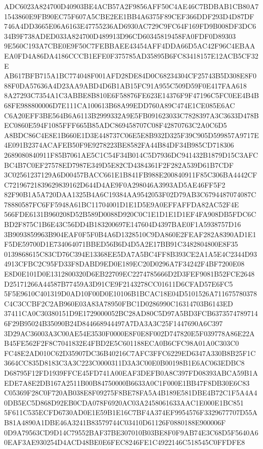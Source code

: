 \documentclass[UTF8,fontset=fandol,zihao=-4,a4paper]{ctexart}
\begin{document}
{{ADC6023A824700D40903BE4ACB57A2F9856AFF50C4AE46C7BDBAB1CB80A71543860E9FB90EC75F607A5CBE2EE1BB4A6375F89CEF366DDF293D4D87DF
746A4DD3665E06A6163E47755236AD6930AC729C9FC64F169FD9B008DF3DC634B9F738ADED033A824700D489913D96CD60345819458FA0FDF0D89303
9E560C193A7CBE0E9F50C7FEBBAEE43454AFF4DDA66D5AC42F96C4EBAAEA0FD4A86DA4186CCCB1EFE0F375785AD35895B6FC83418157E12ACB5CF32E
AB617BFB715A1BC774048F001AFD28DE84D0C68234304CF25743B5D308E8F088F0DA57636A4D23AA9ABD4D6B1AB15FC91A955C509D59F0E417FAA618
8A27293C7354A1C3ABBE8B810E6F58876FE623E14376F9F47196C5FC0EE4B4B68FE988800006D7E111CA100613B68A99EDD760A89C474E1CE085E6AC
C6A20EFF3BE564B6A6113B2999332A9E5FB091623033C7828397A3C3633D478BEC0860E594F1085FFF665B85ADC869458707C08F42870763C2A0C6D5
A8BDC86C4E8E1B660E1D3E448737C06E5E8B932D325F39C905D599857A9717E4E091B2374ACAFEB50F9E9278223BE8582FA44B84DF34B985CD718306
2689080840911F85B7061AE5C1C54F34B014C5D7936DC941432B1879D15C3AFCBC4B7C0EF27578ED7987E349D5E82CD4384361F2F282A539D61B7CDF
3C02561237129A6D00457BACC661E1B841FB988E200840911F85C306BA4442CFC72196721839629839162D644D4AE9F0A298046A3993AD5AE46FF5F2
82F90B1A5A720DAA1325B4A6C19384AA9542053F02D79AB3C6794487074087C78880587FC6FF5948A61BC11704001D1E1D5E9A0EFFAFFDA82AC52F4E
566FDE6131B960208D52B589D0088D920C0C1E1D1E1D1EF4FA908DB5FDC6CBD2F875C1B6E43C56DD4B183200697E147604D4397BAE0F1A5938757D16
3B9093859963B904EAF0F5F0B4A6D1328510C9DA860E2FEAF282A8390AD1E1F5DE59700D1E734064071BBED56B6D4D5A2E17BB91C3482804800E8F35
0139868615C83CD76C394E13368EE5DA7A5BC4FF8B393CE2A1A5E4C2344D934913CFBC2C95FD33F8DABD9ED0E189EC20D0296A7F34242F4BF7200E08
E8D0E101D0E1312800320D6EB22709EC2274785666D2D3FEF9081B52FCE2648D25171266A44587B77459A3D91CE9F2143278CC01611D6CFAD57E6FC5
5F5E9610C401319D0AD10F00D0E10106B1BCAC18E04D5101526A711675780378C4C3CCBF2C2AB960E03A83A78950FBC1D0286990C16314703B6143ED
37411CA0C30380151D9E1729000052BC28AD80C5D97A5BD3FCB63735747897146F29B95024B35090B24D844668944497A7DA3A3C25F1447690A6C397
3D29AC36003A3C00AE54E3530F0000E8F0E8F002D747820E5F039778A86E22AB45FE562F2F8C7041832E4FBD2E5C601188ECA0B6CFC98A01A0C303C0
FC48E2AD010C62D35907DC36B40216C7AFC3FFC6229ED6347A330B8B25F1C3664CC835D8183C3A3C223C0000311D3A3C00E0B00198B1E6AC063EDBC8
D68795F12FD1939FFCE45FD741A00EAF3DEFB0A8C397FD08393ABCA59B1AEDE7A8E2DB167A2511B00B84750000B6633A0C1F000E1BB47F8DB30E6C83
C05369F28C0F720AB038E8F09275F8BE78FA5A4B189E581DBE4B72C1F5A4A40DB5EC5D868D92EB0CDA078F6920AC03A2458061633AAC1E000E1BC851
5F611C535ECFD6730AD0E1E59B1E16C7BF4A374EF9954576F3329677707D55AB81A4890A1DBE46A3241B83579744C03410D61126F0880188E900006F
0D9A79563CD9D14C79552BAF37BE307010B03BE8F0F9AB74E3C68D5F5640A60EAF3AE930254D4ACD48BE0E6FEC8246FE1C4922146C518545C0FFDFE8
}}
\end{document}
